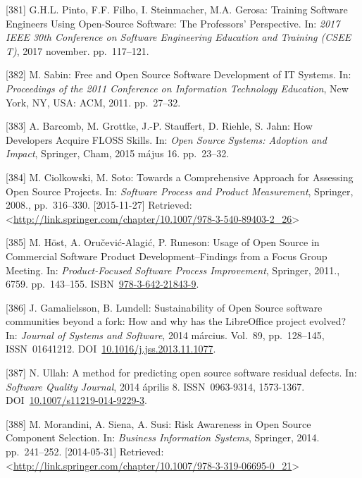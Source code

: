 \documentclass[12pt,magyar,a4paper,oneside]{scrreprt}
\newenvironment{cslreferences}%
  {}%
  {\par}
\begin{document}
\begin{cslreferences}
\leavevmode\hypertarget{ref-pinto_training_2017}{}%
{[}381{]} G.H.L. Pinto, F.F. Filho, I. Steinmacher, M.A. Gerosa:
Training Software Engineers Using Open-Source Software: The Professors'
Perspective. In: \emph{2017 IEEE 30th Conference on Software Engineering
Education and Training (CSEE T)}, 2017 november. pp.~117--121.

\leavevmode\hypertarget{ref-sabin_free_2011}{}%
{[}382{]} M. Sabin: Free and Open Source Software Development of IT
Systems. In: \emph{Proceedings of the 2011 Conference on Information
Technology Education}, New York, NY, USA: ACM, 2011. pp.~27--32.

\leavevmode\hypertarget{ref-barcomb_how_2015}{}%
{[}383{]} A. Barcomb, M. Grottke, J.-P. Stauffert, D. Riehle, S. Jahn:
How Developers Acquire FLOSS Skills. In: \emph{Open Source Systems:
Adoption and Impact}, Springer, Cham, 2015 május 16. pp.~23--32.

\leavevmode\hypertarget{ref-ciolkowski_towards_2008}{}%
{[}384{]} M. Ciolkowski, M. Soto: Towards a Comprehensive Approach for
Assessing Open Source Projects. In: \emph{Software Process and Product
Measurement}, Springer, 2008., pp.~316--330. {[}2015-11-27{]} Retrieved:
\textless{}\url{http://link.springer.com/chapter/10.1007/978-3-540-89403-2_26}\textgreater{}

\leavevmode\hypertarget{ref-host_usage_2011}{}%
{[}385{]} M. Höst, A. Oručević-Alagić, P. Runeson: Usage of Open Source
in Commercial Software Product Development--Findings from a Focus Group
Meeting. In: \emph{Product-Focused Software Process Improvement},
Springer, 2011., 6759. pp.~143--155.
ISBN~\href{https://worldcat.org/isbn/978-3-642-21843-9}{978-3-642-21843-9}.

\leavevmode\hypertarget{ref-gamalielsson_sustainability_2014}{}%
{[}386{]} J. Gamalielsson, B. Lundell: Sustainability of Open Source
software communities beyond a fork: How and why has the LibreOffice
project evolved? In: \emph{Journal of Systems and Software}, 2014
március. Vol.~89, pp.~128--145, ISSN~01641212.
DOI~\href{https://doi.org/10.1016/j.jss.2013.11.1077}{10.1016/j.jss.2013.11.1077}.

\leavevmode\hypertarget{ref-ullah_method_2014}{}%
{[}387{]} N. Ullah: A method for predicting open source software
residual defects. In: \emph{Software Quality Journal}, 2014 április 8.
ISSN~0963-9314, 1573-1367.
DOI~\href{https://doi.org/10.1007/s11219-014-9229-3}{10.1007/s11219-014-9229-3}.

\leavevmode\hypertarget{ref-morandini_risk_2014}{}%
{[}388{]} M. Morandini, A. Siena, A. Susi: Risk Awareness in Open Source
Component Selection. In: \emph{Business Information Systems}, Springer,
2014. pp.~241--252. {[}2014-05-31{]} Retrieved:
\textless{}\url{http://link.springer.com/chapter/10.1007/978-3-319-06695-0_21}\textgreater{}


\end{cslreferences}
\end{document}
